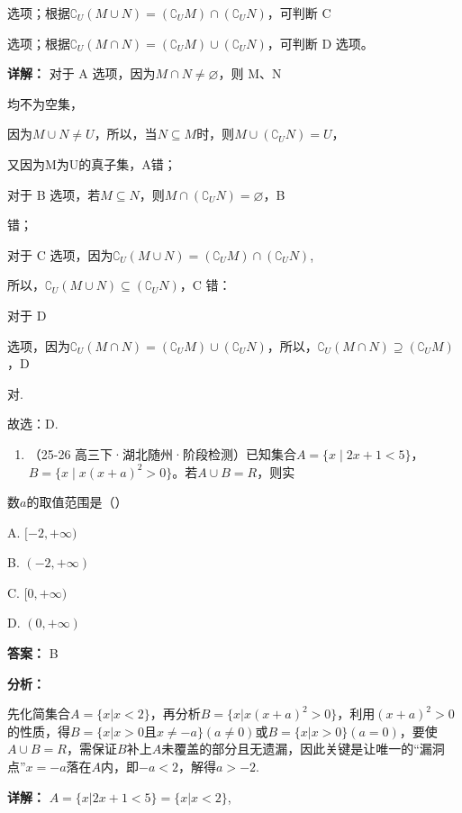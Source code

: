 \documentclass[11pt,a4paper]{ctexart}
\begin{document}
选项；根据\(\complement_U(M \cup N) = (\complement_U M) \cap (\complement_U N)\)，可判断 C

选项；根据\(\complement_U(M \cap N) = (\complement_U M) \cup (\complement_U N)\)，可判断 D 选项。

\textbf{详解：}
对于 A 选项，因为\(M \cap N \neq \varnothing\)，则 M、N

均不为空集，

因为\(M \cup N \neq U\)，所以，当\(N \subseteq M\)时，则\(M \cup (\complement_U N) = U\)，

又因为M为U的真子集，A错；

对于 B 选项，若\(M \subseteq N\)，则\(M \cap (\complement_UN) = \varnothing\)，B

错；

对于 C 选项，因为\(\complement_U(M \cup N) = (\complement_UM) \cap (\complement_UN)\),

所以，\(\complement_U(M \cup N) \subseteq (\complement_UN)\)，C 错：

对于 D

选项，因为\(\complement_U(M \cap N) = (\complement_UM) \cup (\complement_UN)\)，所以，\(\complement_U(M \cap N) \supseteq (\complement_UM)\)，D

对.

故选：D.

\begin{enumerate}[label=\arabic*., leftmargin=*, start=5]
\item （25-26
  高三下·湖北随州·阶段检测）已知集合\(A = \{x \mid 2x + 1 < 5\}\)，\(B = \{x \mid x(x + a)^2 > 0\}\)。若\(A \cup B = R\)，则实
\end{enumerate}

数\(a\)的取值范围是（）

A. \([-2, +\infty)\)

B. \((-2, +\infty)\)

C. \([0, +\infty)\)

D. \((0, +\infty)\)

\textbf{答案：}
B

\textbf{分析：}

先化简集合\(A = \{x | x < 2\}\)，再分析\(B = \{x | x(x + a)^2 > 0\}\)，利用\((x + a)^2 > 0\)的性质，得\(B = \{x | x > 0\)且\(x \neq -a\} (a \neq 0)\)或\(B = \{x | x > 0\} (a = 0)\)，要使\(A \cup B = R\)，需保证\(B\)补上\(A\)未覆盖的部分且无遗漏，因此关键是让唯一的``漏洞点''\(x = -a\)落在\(A\)内，即\(-a < 2\)，解得\(a > -2\).

\textbf{详解：}
\(A=\{x|2x+1<5\}=\{x|x<2\}\),
\end{document}
